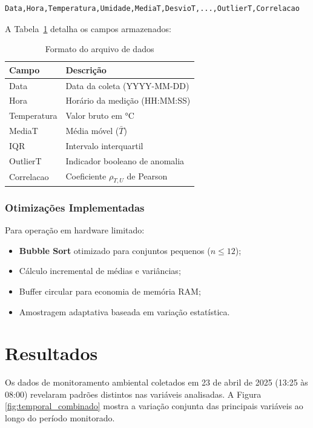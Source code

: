 \documentclass[12pt, a4paper]{article}
\begin{document}
\begin{verbatim}
Data,Hora,Temperatura,Umidade,MediaT,DesvioT,...,OutlierT,Correlacao
\end{verbatim}

A Tabela~\ref{tab:formato_dados} detalha os campos armazenados:

\begin{table}[ht]
    \centering
    \caption{Formato do arquivo de dados}
    \label{tab:formato_dados}
    \begin{tabular}{|l|l|}
        \hline
        Campo & Descrição \\ \hline
        \hline
        Data & Data da coleta (YYYY-MM-DD) \\
        \hline
        Hora & Horário da medição (HH:MM:SS) \\
        \hline
        Temperatura & Valor bruto em °C \\
        \hline
        MediaT & Média móvel ($\bar{T}$) \\
        \hline
        IQR & Intervalo interquartil \\
        \hline
        OutlierT & Indicador booleano de anomalia \\
        \hline
        Correlacao & Coeficiente $\rho_{T,U}$ de Pearson \\ \hline
    \end{tabular}
\end{table}

\subsubsection{Otimizações Implementadas}
Para operação em hardware limitado:

\begin{itemize}
    \item \textbf{Bubble Sort} otimizado para conjuntos pequenos ($n \leq 12$);
    \item Cálculo incremental de médias e variâncias;
    \item Buffer circular para economia de memória RAM;
    \item Amostragem adaptativa baseada em variação estatística.
\end{itemize}

\section{Resultados}
\label{sec:resultados}

Os dados de monitoramento ambiental coletados em 23 de abril de 2025 (13:25 às 08:00) revelaram padrões distintos nas variáveis analisadas. A Figura \ref{fig:temporal_combinado} mostra a variação conjunta das principais variáveis ao longo do período monitorado.
\end{document}
